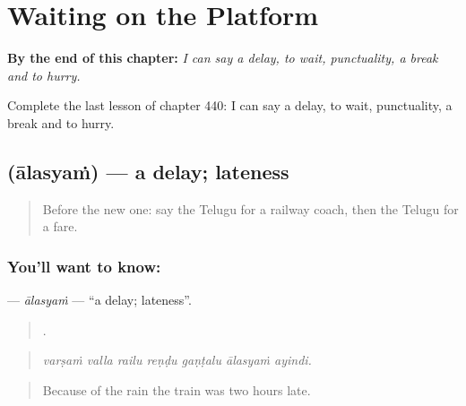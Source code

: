 
\chapter{Waiting on the Platform}
\label{ch:te-waiting-on-the-platform}

\begin{chapteropening}
\textbf{By the end of this chapter:} \emph{I can say a delay, to wait, punctuality, a break and to hurry.}

Complete the last lesson of chapter 440: I can say a delay, to wait, punctuality, a break and to hurry.
\end{chapteropening}

\section[\texorpdfstring{\te{ఆలస్యం} (ālasyaṁ)}{ఆలస్యం (ālasyaṁ)}]{ (ālasyaṁ) — a delay; lateness}

\label{lesson:TE-C440-alasyam}



\begin{quote}
Before the new one: say the Telugu for a railway coach, then the Telugu for a fare.
\end{quote}

\subsection*{You'll want to know: }
\textbf{} — \emph{ālasyaṁ} — \textquotedblleft{}a delay; lateness\textquotedblright{}.

\begin{quote}
      .
\end{quote}

\begin{quote}
\emph{varṣaṁ valla railu reṇḍu gaṇṭalu ālasyaṁ ayindi.}
\end{quote}

\begin{quote}
Because of the rain the train was two hours late.
\end{quote}

